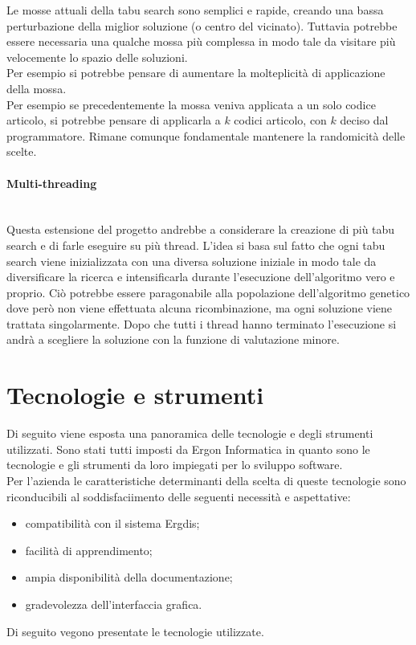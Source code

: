 Le mosse attuali della tabu search sono semplici e rapide,
creando una bassa perturbazione della miglior soluzione
(o centro del vicinato). Tuttavia potrebbe essere necessaria
una qualche mossa più complessa in modo tale da visitare
più velocemente lo spazio delle soluzioni.\\
Per esempio si potrebbe pensare di aumentare la molteplicità
di applicazione della mossa.\\ Per esempio se precedentemente
la mossa veniva applicata a un solo codice articolo, si potrebbe
pensare di applicarla a $k$ codici articolo, con $k$
deciso dal programmatore. Rimane comunque fondamentale mantenere
la randomicità delle scelte.
\vspace*{0.3cm}
\noindent \paragraph{Multi-threading}\hfill\\
Questa estensione del progetto andrebbe a considerare la
creazione di più tabu search e di farle eseguire su più thread.
L'idea si basa sul fatto che ogni tabu search viene inizializzata
con una diversa soluzione iniziale in modo tale da diversificare
la ricerca e intensificarla durante l'esecuzione dell'algoritmo
vero e proprio. Ciò potrebbe essere paragonabile alla popolazione
dell'algoritmo genetico dove però non viene effettuata alcuna
ricombinazione, ma ogni soluzione viene trattata singolarmente.
Dopo che tutti i thread hanno terminato l'esecuzione si andrà
a scegliere la soluzione con la funzione di valutazione minore.

\newpage

\section{Tecnologie e strumenti}
\label{sec:tecnologie-strumenti}

\noindent Di seguito viene esposta una panoramica delle tecnologie e degli strumenti utilizzati.
Sono stati tutti imposti da Ergon Informatica in quanto sono le tecnologie e gli strumenti
da loro impiegati per lo sviluppo software.\\
Per l’azienda le caratteristiche determinanti della scelta di queste tecnologie
sono riconducibili al soddisfaciimento delle seguenti necessità e aspettative:
\begin{itemize}
    \item compatibilità con il sistema Ergdis;
    \item facilità di apprendimento;
    \item ampia disponibilità della documentazione;
    \item gradevolezza dell’interfaccia grafica.
\end{itemize}
Di seguito vegono presentate le tecnologie utilizzate.


